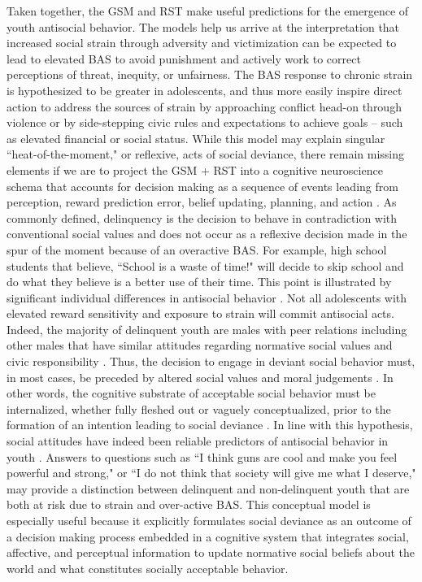 \documentclass[utf8]{article}
\begin{document}
Taken together, the GSM and RST make useful predictions for the emergence of youth antisocial behavior. The models help us arrive at the interpretation that increased social strain through adversity and victimization can be expected to lead to elevated BAS to avoid punishment and actively work to correct perceptions of threat, inequity, or unfairness. The BAS response to chronic strain is hypothesized to be greater in adolescents, and thus more easily inspire direct action to address the sources of strain by approaching conflict head-on through violence or by side-stepping civic rules and expectations to achieve goals -- such as elevated financial or social status. While this model may explain singular  ``heat-of-the-moment," or reflexive, acts of social deviance, there remain missing elements if we are to project the GSM + RST into a cognitive neuroscience schema that accounts for decision making as a sequence of events leading from perception, reward prediction error, belief updating, planning, and action \citep{cosmides1997dissecting,cosmides2000socialreason,van2010interpersonal}. As commonly defined, delinquency is the decision to behave in contradiction with conventional social values and does not occur as a reflexive decision made in the spur of the moment because of an overactive BAS. For example, high school students that believe, ``School is a waste of time!" will decide to skip school and do what they believe is a better use of their time. This point is illustrated by significant individual differences in antisocial behavior \citep{mazerolle1998gender}. Not all adolescents with elevated reward sensitivity and exposure to strain will commit antisocial acts. Indeed, the majority of delinquent youth are males with peer relations including other males that have similar attitudes regarding normative social values and civic responsibility \citep{mears1998explaining}. Thus, the decision to engage in deviant social behavior must, in most cases, be preceded by altered social values and moral judgements \citep{stams2006moral}. In other words, the cognitive substrate of acceptable social behavior must be internalized, whether fully fleshed out or vaguely conceptualized, prior to the formation of an intention leading to social deviance \citep{pogarsky2018offender}. In line with this hypothesis, social attitudes have indeed been reliable predictors of antisocial behavior in youth \citep{tarry2007attitudes}. Answers to questions such as ``I think guns are cool and make you feel powerful and strong," or ``I do not think that society will give me what I deserve," may provide a distinction between delinquent and non-delinquent youth that are both at risk due to strain and over-active BAS. This conceptual model is especially useful because it explicitly formulates social deviance as an outcome of a decision making process embedded in a cognitive system that integrates social, affective, and perceptual information to update normative social beliefs about the world and what constitutes socially acceptable behavior.
\end{document}
